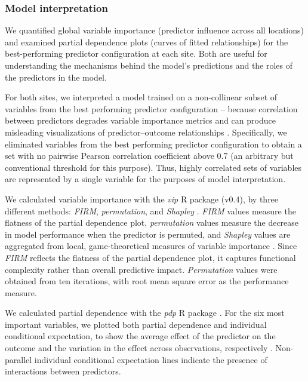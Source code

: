\documentclass[soil, manuscript]{copernicus}
\begin{document}
\subsubsection{Model interpretation}

We quantified global variable importance (predictor influence across all locations) and examined partial dependence plots (curves of fitted relationships) for the best-performing predictor configuration at each site.
Both are useful for understanding the mechanisms behind the model's predictions and the roles of the predictors in the model.

For both sites, we interpreted a model trained on a non-collinear subset of variables from the best performing predictor configuration -- because correlation between predictors degrades variable importance metrics \citep{stroblConditionalVariableImportance2008, biauRandomForestGuided2016} and can produce misleading visualizations of predictor--outcome relationships \citep{biecekExplanatoryModelAnalysis2021, dwivediExplainableAIXAI2023}.
Specifically, we eliminated variables from the best performing predictor configuration to obtain a set with no pairwise Pearson correlation coefficient above 0.7 (an arbitrary but conventional threshold for this purpose).
Thus, highly correlated sets of variables are represented by a single variable for the purposes of model interpretation.

We calculated variable importance with the \emph{vip} R package (v0.4), by three different methods: \emph{FIRM}, \emph{permutation}, and \emph{Shapley} \citep{greenwellVariableImportancePlots2020}.
\emph{FIRM} values measure the flatness of the partial dependence plot, \emph{permutation} values measure the decrease in model performance when the predictor is permuted, and \emph{Shapley} values are aggregated from local, game-theoretical measures of variable importance \citep{greenwellVariableImportancePlots2020}.
Since \emph{FIRM} reflects the flatness of the partial dependence plot, it captures functional complexity rather than overall predictive impact.
\emph{Permutation} values were obtained from ten iterations, with root mean square error as the performance measure.

We calculated partial dependence with the \emph{pdp} R package \citep[v0.8,][]{greenwellPdpPackageConstructing2017}.
For the six most important variables, we plotted both partial dependence and individual conditional expectation, to show the average effect of the predictor on the outcome and the variation in the effect across observations, respectively \citep{goldsteinPeekingBlackBox2015}.
Non-parallel individual conditional expectation lines indicate the presence of interactions between predictors.
\end{document}
